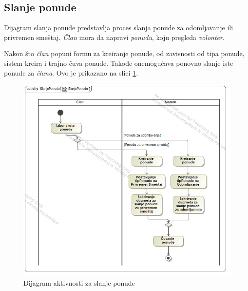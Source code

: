 \subsection{Slanje ponude}
\par Dijagram slanja ponude predstavlja proces slanja ponude za odomljavanje ili privremen smeštaj. \textit{Član} mora da napravi \textit{ponudu}, koju pregleda \textit{volonter}.
\par Nakon što \textit{član} popuni formu za kreiranje ponude, od zavisnosti od tipa ponude, sistem kreira i trajno čuva ponude. Takođe onemogućava ponovno slanje
iste ponude za \textit{člana}. Ovo je prikazano na slici \ref{fig:activity-send-offer}.
\begin{figure}[ht]
    \centering
    \includegraphics[width=\textwidth, height=\textwidth]{img/send_offer.jpg}
    \caption{Dijagram aktivnosti za slanje ponude}
    \label{fig:activity-send-offer}
\end{figure}
